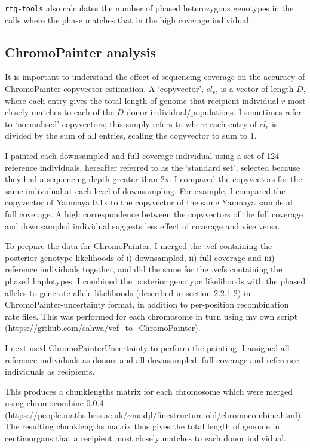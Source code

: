 \texttt{rtg-tools} also calculates the number of phased heterozygous genotypes in the calls where the phase matches that in the high coverage individual. 

\subsection{ChromoPainter analysis} \label{ChromoPainter_analysis}

It is important to understand the effect of sequencing coverage on the accuracy of ChromoPainter copyvector estimation. A `copyvector', $cl_{r}$, is a vector of length $D$, where each entry gives the total length of genome that recipient individual $r$ most closely matches to each of the $D$ donor individual/populations. I sometimes refer to `normalised' copyvectors; this simply refers to where each entry of $cl_r$ is divided by the sum of all entries, scaling the copyvector to sum to 1. 

I painted each downsampled and full coverage individual using a set of 124 reference individuals, hereafter referred to as the `standard set', selected because they had a sequencing depth greater than 2x. I compared the copyvectors for the same individual at each level of downsampling. For example, I compared the copyvector of Yamnaya 0.1x to the copyvector of the same Yamnaya sample at full coverage. A high correspondence between the copyvectors of the full coverage and downsampled individual suggests less effect of coverage and vice versa. 

To prepare the data for ChromoPainter, I merged the .vcf containing the posterior genotype likelihoods of i) downsampled, ii) full coverage and iii) reference individuals together, and did the same for the .vcfs containing the phased haplotypes.  I combined the posterior genotype likelihoods with the phased alleles to generate allele likelihoods (described in section 2.2.1.2) in ChromoPainter-uncertainty format, in addition to per-position recombination rate files. This was performed for each chromosome in turn using my own script (\url{https://github.com/sahwa/vcf_to_ChromoPainter}).

I next used ChromoPainterUncertainty to perform the painting. I assigned all reference individuals as donors and all downsampled, full coverage and reference individuals as recipients. 

This produces a chunklengths matrix for each chromosome which were merged using chromocombine-0.0.4 (\url{https://people.maths.bris.ac.uk/~madjl/finestructure-old/chromocombine.html}). The resulting chunklengths matrix thus gives the total length of genome in centimorgans that a recipient most closely matches to each donor individual. 

